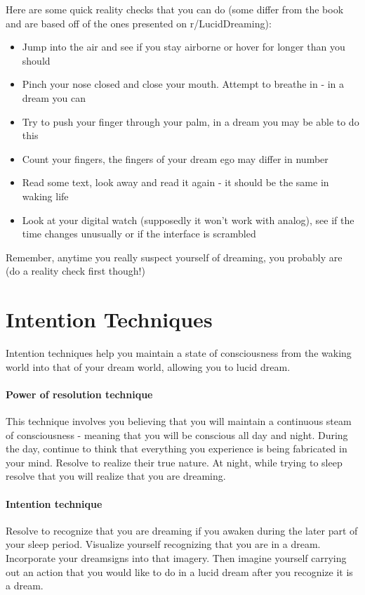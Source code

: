 \documentclass{book}
\begin{document}
Here are some quick reality checks that you can do (some differ from the book and are based off of the ones presented on r/LucidDreaming):
\begin{itemize}
  \item Jump into the air and see if you stay airborne or hover for longer than you should
  \item Pinch your nose closed and close your mouth. Attempt to breathe in - in a dream you can
  \item Try to push your finger through your palm, in a dream you may be able to do this
  \item Count your fingers, the fingers of your dream ego may differ in number
  \item Read some text, look away and read it again - it should be the same in waking life
  \item Look at your digital watch (supposedly it won't work with analog), see if the time changes unusually or if the interface is scrambled
\end{itemize}

Remember, anytime you really suspect yourself of dreaming, you probably are (do a reality check first though!)

\section{Intention Techniques}
Intention techniques help you maintain a state of consciousness from the waking world into that of your dream world, allowing you to lucid dream.

\paragraph{Power of resolution technique} This technique involves you believing that you will maintain a continuous steam of consciousness - meaning that you will be conscious all day and night. During the day, continue to think that everything you experience is being fabricated in your mind. Resolve to realize their true nature. At night, while trying to sleep resolve that you will realize that you are dreaming.

\paragraph{Intention technique} Resolve to recognize that you are dreaming if you awaken during the later part of your sleep period. Visualize yourself recognizing that you are in a dream. Incorporate your dreamsigns into that imagery. Then imagine yourself carrying out an action that you would like to do in a lucid dream after you recognize it is a dream.
\end{document}
